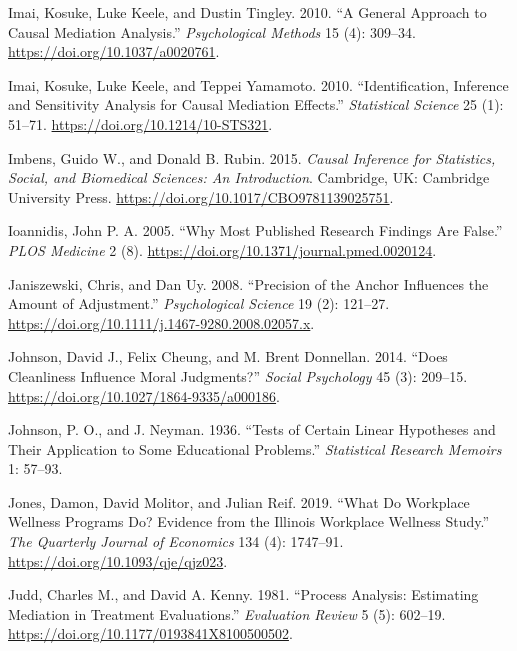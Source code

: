 \documentclass[
  11pt,
  letterpaper,
]{scrbook}
\newlength{\cslhangindent}
\newenvironment{CSLReferences}[2] %
 {\begin{list}{}{%
  \setlength{\itemindent}{0pt}
  \setlength{\leftmargin}{0pt}
  \setlength{\parsep}{0pt}
  \ifodd #1
   \setlength{\leftmargin}{\cslhangindent}
   \setlength{\itemindent}{-1\cslhangindent}
  \fi
  \setlength{\itemsep}{#2\baselineskip}}}
 {\end{list}}
\theoremstyle{definition}
\theoremstyle{definition}
\theoremstyle{remark}
\begin{document}
\begin{CSLReferences}{1}{0}
Imai, Kosuke, Luke Keele, and Dustin Tingley. 2010. {``A General
Approach to Causal Mediation Analysis.''} \emph{Psychological Methods}
15 (4): 309--34. \url{https://doi.org/10.1037/a0020761}.

Imai, Kosuke, Luke Keele, and Teppei Yamamoto. 2010. {``Identification,
Inference and Sensitivity Analysis for Causal Mediation Effects.''}
\emph{Statistical Science} 25 (1): 51--71.
\url{https://doi.org/10.1214/10-STS321}.

Imbens, Guido W., and Donald B. Rubin. 2015. \emph{Causal Inference for
Statistics, Social, and Biomedical Sciences: An Introduction}.
Cambridge, UK: Cambridge University Press.
\url{https://doi.org/10.1017/CBO9781139025751}.

Ioannidis, John P. A. 2005. {``Why Most Published Research Findings Are
False.''} \emph{PLOS Medicine} 2 (8).
\url{https://doi.org/10.1371/journal.pmed.0020124}.

Janiszewski, Chris, and Dan Uy. 2008. {``Precision of the Anchor
Influences the Amount of Adjustment.''} \emph{Psychological Science} 19
(2): 121--27. \url{https://doi.org/10.1111/j.1467-9280.2008.02057.x}.

Johnson, David J., Felix Cheung, and M. Brent Donnellan. 2014. {``Does
Cleanliness Influence Moral Judgments?''} \emph{Social Psychology} 45
(3): 209--15. \url{https://doi.org/10.1027/1864-9335/a000186}.

Johnson, P. O., and J. Neyman. 1936. {``Tests of Certain Linear
Hypotheses and Their Application to Some Educational Problems.''}
\emph{Statistical Research Memoirs} 1: 57--93.

Jones, Damon, David Molitor, and Julian Reif. 2019. {``What Do Workplace
Wellness Programs Do? Evidence from the {I}llinois Workplace Wellness
Study.''} \emph{The Quarterly Journal of Economics} 134 (4): 1747--91.
\url{https://doi.org/10.1093/qje/qjz023}.

Judd, Charles M., and David A. Kenny. 1981. {``Process Analysis:
Estimating Mediation in Treatment Evaluations.''} \emph{Evaluation
Review} 5 (5): 602--19.
\url{https://doi.org/10.1177/0193841X8100500502}.


\end{CSLReferences}
\end{document}
